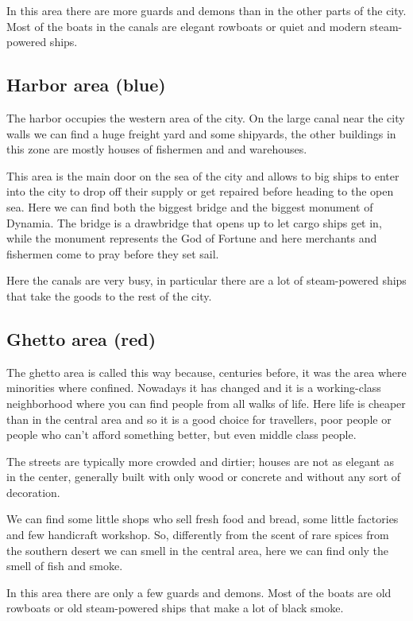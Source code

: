In this area there are more guards and demons than in the other parts of the city. Most of the boats in the canals are elegant rowboats or quiet and modern steam-powered ships.

\subsection{Harbor area (blue)}
The harbor occupies the western area of the city. On the large canal near the city walls we can find a huge freight yard and some shipyards, the  other buildings in this zone are mostly houses of fishermen and and warehouses.

This area is the main door on the sea of the city and allows to big ships to enter into the city to drop off their supply or get repaired before heading to the open sea. Here we can find both the biggest bridge and the biggest monument of Dynamia. The bridge is a drawbridge that opens up to let cargo ships get in, while the monument represents the God of Fortune and here merchants and fishermen come to pray before they set sail.

Here the canals are very busy, in particular there are a lot of steam-powered ships that take the goods to the rest of the city.

\subsection{Ghetto area (red)}
The ghetto area is called this way because, centuries before, it was the area where  minorities where confined. Nowadays it has changed and it is a working-class neighborhood where you can find people from all walks of life. Here life is cheaper than in the central area and so it is a good choice for travellers, poor people or people who can't afford something better, but even middle class people.

The streets are typically more crowded and dirtier; houses are not as elegant as in the center, generally built with only wood or concrete and without any sort of decoration.

We can find some little shops who sell fresh food and bread, some little factories and few handicraft workshop. So, differently from the scent of rare spices from the southern desert we can smell in the central area, here we can find only the smell of fish and smoke.

In this area there are only a few guards and demons. Most of the boats are old rowboats or old steam-powered ships that make a lot of black smoke.
